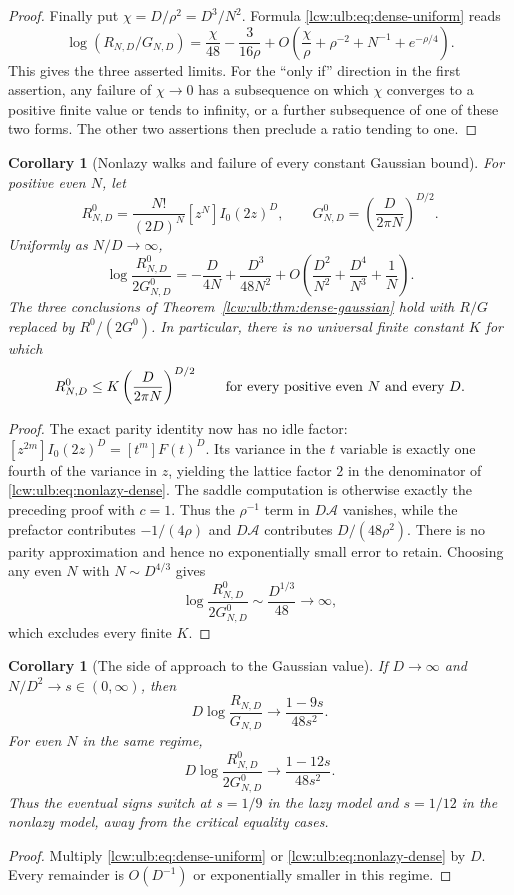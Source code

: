 \documentclass[11pt,letterpaper]{article}
\newtheorem{corollary}[theorem]{Corollary}
\theoremstyle{remark}\newtheorem{remark}[theorem]{Remark}
\begin{document}
\begin{proof}
Finally put $\chi=D/\rho^2=D^3/N^2$. Formula
\eqref{lcw:ulb:eq:dense-uniform} reads
\[
 \log(R_{N,D}/G_{N,D})
 =\frac\chi{48}-\frac3{16\rho}
    +O\left(\frac\chi\rho+\rho^{-2}+N^{-1}+e^{-\rho/4}\right).
\]
This gives the three asserted limits. For the ``only if'' direction
in the first assertion, any failure of $\chi\to0$ has a subsequence
on which $\chi$ converges to a positive finite value or tends to
infinity, or a further subsequence of one of these two forms.
The other two assertions then preclude a ratio tending to one.
\end{proof}

\begin{corollary}[Nonlazy walks and failure of every constant Gaussian bound]
\label{lcw:ulb:cor:nonlazy-dense}
For positive even $N$, let
\[
 R^0_{N,D}=\frac{N!}{(2D)^N}[z^N]I_0(2z)^D,\qquad
 G^0_{N,D}=\left(\frac{D}{2\pi N}\right)^{D/2}.
\]
Uniformly as $N/D\to\infty$,
\begin{equation}\label{lcw:ulb:eq:nonlazy-dense}
 \log\frac{R^0_{N,D}}{2G^0_{N,D}}
 =-\frac{D}{4N}+\frac{D^3}{48N^2}
  +O\left(\frac{D^2}{N^2}+\frac{D^4}{N^3}+\frac1N\right).
\end{equation}
The three conclusions of Theorem~\ref{lcw:ulb:thm:dense-gaussian} hold with
$R/G$ replaced by $R^0/(2G^0)$. In particular, there is no universal
finite constant $K$ for which
\[
 R^0_{N,D}\le K\left(\frac{D}{2\pi N}\right)^{D/2}
 \qquad\hbox{for every positive even $N$ and every $D$}.
\]
\end{corollary}
\begin{proof}
The exact parity identity now has no idle factor:
$[z^{2m}]I_0(2z)^D=[t^m]F(t)^D$. Its variance in the $t$ variable
is exactly one fourth of the variance in $z$, yielding the lattice
factor $2$ in the denominator of \eqref{lcw:ulb:eq:nonlazy-dense}.
The saddle computation is otherwise exactly the preceding proof
with $c=1$. Thus the $\rho^{-1}$ term in $D\mathcal A$ vanishes,
while the prefactor contributes $-1/(4\rho)$ and
$D\mathcal A$ contributes $D/(48\rho^2)$. There is no parity
approximation and hence no exponentially small error to retain.
Choosing any even $N$ with $N\sim D^{4/3}$ gives
\[
 \log\frac{R^0_{N,D}}{2G^0_{N,D}}
       \sim\frac{D^{1/3}}{48}\longrightarrow\infty,
\]
which excludes every finite $K$.
\end{proof}

\begin{corollary}[The side of approach to the Gaussian value]
\label{lcw:ulb:cor:gaussian-sign}
If $D\to\infty$ and $N/D^2\to s\in(0,\infty)$, then
\[
 D\log\frac{R_{N,D}}{G_{N,D}}
     \longrightarrow\frac{1-9s}{48s^2}.
\]
For even $N$ in the same regime,
\[
 D\log\frac{R^0_{N,D}}{2G^0_{N,D}}
     \longrightarrow\frac{1-12s}{48s^2}.
\]
Thus the eventual signs switch at $s=1/9$ in the lazy model and
$s=1/12$ in the nonlazy model, away from the critical equality cases.
\end{corollary}
\begin{proof}
Multiply \eqref{lcw:ulb:eq:dense-uniform} or \eqref{lcw:ulb:eq:nonlazy-dense} by $D$.
Every remainder is $O(D^{-1})$ or exponentially smaller in this regime.
\end{proof}
\end{document}
